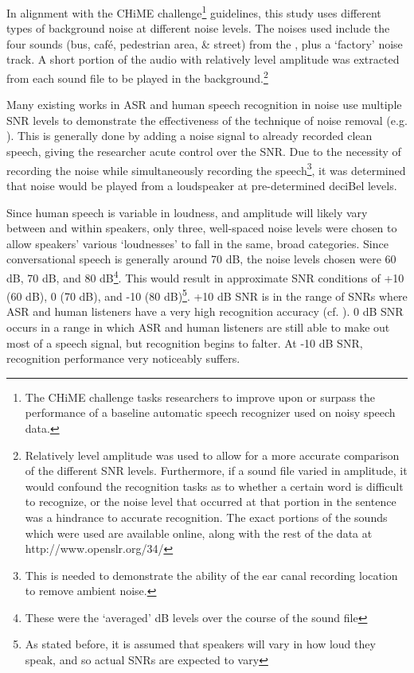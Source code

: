 \documentclass[dissertation,copyright]{uathesis}
\begin{document}
In alignment with the CHiME challenge\footnote{The CHiME challenge tasks researchers to improve upon or surpass the performance of a baseline automatic speech recognizer used on noisy speech data.} guidelines, this study uses different types of background noise at different noise levels.  The noises used include the four sounds (bus, caf\'{e}, pedestrian area, \& street) from the \cite{chime:16}, plus a `factory' noise track.  A short portion of the audio with relatively level amplitude was extracted from each sound file to be played in the background.\footnote{Relatively level amplitude was used to allow for a more accurate comparison of the different SNR levels. Furthermore, if a sound file varied in amplitude, it would confound the recognition tasks as to whether a certain word is difficult to recognize, or the noise level that occurred at that portion in the sentence was a hindrance to accurate recognition. The exact portions of the sounds which were used are available online, along with the rest of the data at http://www.openslr.org/34/}

Many existing works in ASR and human speech recognition in noise use multiple SNR levels to demonstrate the effectiveness of the technique of noise removal (e.g. \cite{braun:16}).  This is generally done by adding a noise signal to already recorded clean speech, giving the researcher acute control over the SNR.  Due to the necessity of recording the noise while simultaneously recording the speech\footnote{This is needed to demonstrate the ability of the ear canal recording location to remove ambient noise.}, it was determined that noise would be played from a loudspeaker at pre-determined deciBel levels.  

Since human speech is variable in loudness, and amplitude will likely vary between and within speakers, only three, well-spaced noise levels were chosen to allow speakers' various `loudnesses' to fall in the same, broad categories.  Since conversational speech is generally around 70 dB, the noise levels chosen were 60 dB, 70 dB, and 80 dB\footnote{These were the `averaged' dB levels over the course of the sound file}. This would result in approximate SNR conditions of +10 (60 dB), 0 (70 dB), and -10 (80 dB)\footnote{As stated before, it is assumed that speakers will vary in how loud they speak, and so actual SNRs are expected to vary}.  +10 dB SNR is in the range of SNRs where ASR and human listeners have a very high recognition accuracy (cf. \cite{braun:16,gilbert:13}).  0 dB SNR occurs in a range in which ASR and human listeners are still able to make out most of a speech signal, but recognition begins to falter.  At -10 dB SNR, recognition performance very noticeably suffers.
\end{document}
